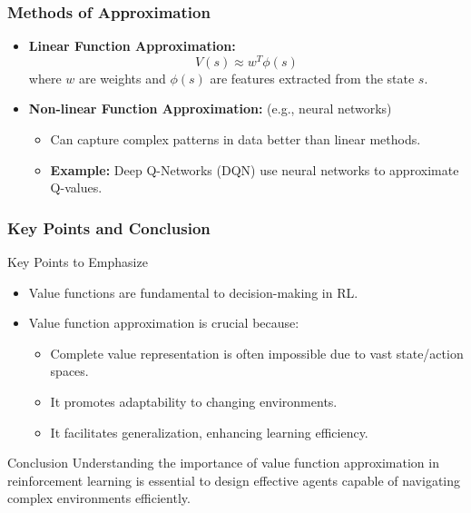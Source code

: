 \documentclass[aspectratio=169]{beamer}
\begin{document}
\begin{frame}[fragile]
    \frametitle{Methods of Approximation}
    \begin{itemize}
        \item \textbf{Linear Function Approximation:} 
        \begin{equation}
            V(s) \approx w^T \phi(s)
        \end{equation}
        where \(w\) are weights and \(\phi(s)\) are features extracted from the state \(s\).
        
        \item \textbf{Non-linear Function Approximation:} (e.g., neural networks)
        \begin{itemize}
            \item Can capture complex patterns in data better than linear methods.
            \item \textbf{Example:} Deep Q-Networks (DQN) use neural networks to approximate Q-values.
        \end{itemize}
    \end{itemize}
\end{frame}

\begin{frame}[fragile]
    \frametitle{Key Points and Conclusion}
    \begin{block}{Key Points to Emphasize}
        \begin{itemize}
            \item Value functions are fundamental to decision-making in RL.
            \item Value function approximation is crucial because:
            \begin{itemize}
                \item Complete value representation is often impossible due to vast state/action spaces.
                \item It promotes adaptability to changing environments.
                \item It facilitates generalization, enhancing learning efficiency.
            \end{itemize}
        \end{itemize}
    \end{block}

    \begin{block}{Conclusion}
        Understanding the importance of value function approximation in reinforcement learning is essential to design effective agents capable of navigating complex environments efficiently.
    \end{block}
\end{frame}
\end{document}
